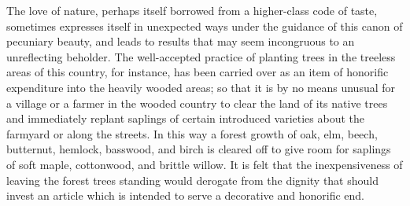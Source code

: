 \documentclass[12pt]{report}
\begin{document}
The love of nature, perhaps itself borrowed from a higher-class code of
taste, sometimes expresses itself in unexpected ways under the guidance
of this canon of pecuniary beauty, and leads to results that may seem
incongruous to an unreflecting beholder. The well-accepted practice of
planting trees in the treeless areas of this country, for instance, has
been carried over as an item of honorific expenditure into the heavily
wooded areas; so that it is by no means unusual for a village or a
farmer in the wooded country to clear the land of its native trees and
immediately replant saplings of certain introduced varieties about the
farmyard or along the streets. In this way a forest growth of oak, elm,
beech, butternut, hemlock, basswood, and birch is cleared off to give
room for saplings of soft maple, cottonwood, and brittle willow. It is
felt that the inexpensiveness of leaving the forest trees standing
would derogate from the dignity that should invest an article which is
intended to serve a decorative and honorific end.
\end{document}
